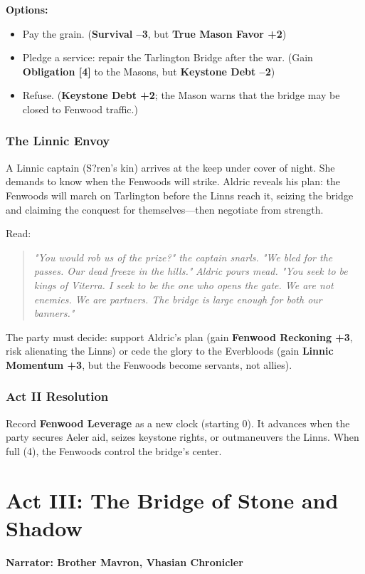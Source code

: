 \documentclass[11pt]{book}
\begin{document}
\textbf{Options:}
\begin{itemize}
    \item Pay the grain. (\textbf{Survival --3}, but \textbf{True Mason Favor +2})
    \item Pledge a service: repair the Tarlington Bridge after the war. (Gain \textbf{Obligation [4]} to the Masons, but \textbf{Keystone Debt --2})
    \item Refuse. (\textbf{Keystone Debt +2}; the Mason warns that the bridge may be closed to Fenwood traffic.)
\end{itemize}

\subsection*{The Linnic Envoy}
A Linnic captain (S?ren's kin) arrives at the keep under cover of night. She demands to know when the Fenwoods will strike. Aldric reveals his plan: the Fenwoods will march on Tarlington before the Linns reach it, seizing the bridge and claiming the conquest for themselves---then negotiate from strength.

Read:
\begin{quote}
\emph{"You would rob us of the prize?" the captain snarls. "We bled for the passes. Our dead freeze in the hills."}
\emph{Aldric pours mead. "You seek to be kings of Viterra. I seek to be the one who opens the gate. We are not enemies. We are partners. The bridge is large enough for both our banners."}
\end{quote}

The party must decide: support Aldric's plan (gain \textbf{Fenwood Reckoning +3}, risk alienating the Linns) or cede the glory to the Everbloods (gain \textbf{Linnic Momentum +3}, but the Fenwoods become servants, not allies).

\subsection*{Act II Resolution}
Record \textbf{Fenwood Leverage} as a new clock (starting 0). It advances when the party secures Aeler aid, seizes keystone rights, or outmaneuvers the Linns. When full (4), the Fenwoods control the bridge's center.

\clearpage

\chapter{Act III: The Bridge of Stone and Shadow}
\textbf{Narrator: Brother Mavron, Vhasian Chronicler}
\end{document}
